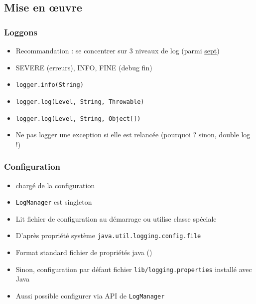 \documentclass[english, french]{beamer}
\begin{document}
\subsection{Mise en œuvre}
\begin{frame}
	\frametitle{Loggons}
	\begin{itemize}
		\item Recommandation : se concentrer sur 3 niveaux de log {\tiny (parmi \href{https://docs.oracle.com/javase/8/docs/api/java/util/logging/Level.html}{sept})}
		\item SEVERE (erreurs), INFO, FINE (debug fin)
		\item \texttt{logger.info(String)}
		\item \texttt{logger.log(Level, String, Throwable)}
		\item \texttt{logger.log(Level, String, Object[])}
		\item Ne pas logger une exception si elle est relancée (pourquoi ? \pause sinon, double log !)
	\end{itemize}
\end{frame}

\begin{frame}
	\frametitle{Configuration}
	\begin{itemize}
		\item {} chargé de la configuration
		\item \texttt{LogManager} est singleton
		\item Lit fichier de configuration au démarrage {\tiny ou utilise classe spéciale}
		\item D’après propriété système \texttt{java.util.logging.config.file}
		\item Format standard fichier de propriétés java {\tiny ()}
		\item Sinon, configuration par défaut {\tiny fichier \texttt{lib/logging.properties} installé avec Java}
		\item Aussi possible configurer via API de \texttt{LogManager}
	\end{itemize}
\end{frame}
\end{document}
